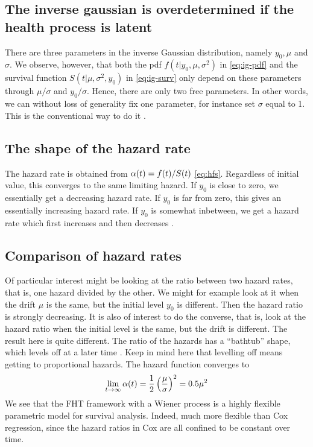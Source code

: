 \subsection{The inverse gaussian is overdetermined if the health process is latent}
There are three parameters in the inverse Gaussian distribution, namely $y_0, \mu$ and $\sigma$. We observe, however, that both the pdf $f(t|y_0,\mu,\sigma^2)$ in \eqref{eq:ig-pdf} and the survival function $S(t|\mu,\sigma^2,y_0)$ in \eqref{eq:ig-surv} only depend on these parameters through $\mu/\sigma$ and $y_0/\sigma$. Hence, there are only two free parameters. In other words, we can without loss of generality fix one parameter, for instance set $\sigma$ equal to 1. This is the conventional way to do it \citep{leewhitmore2006}.

\subsection{The shape of the hazard rate}
The hazard rate is obtained from $\alpha(t)=f(t)/S(t)$ \eqref{eq:hfs}. Regardless of initial value, this converges to the same limiting hazard. If $y_0$ is close to zero, we essentially get a decreasing hazard rate. If $y_0$ is far from zero, this gives an essentially increasing hazard rate. If $y_0$ is somewhat inbetween, we get a hazard rate which first increases and then decreases \citep{ABG}.


\subsection{Comparison of hazard rates}
Of particular interest might be looking at the ratio between two hazard rates, that is, one hazard divided by the other. We might for example look at it when the drift $\mu$ is the same, but the initial level $y_0$ is different. Then the hazard ratio is strongly decreasing. It is also of interest to do the converse, that is, look at the hazard ratio when the initial level is the same, but the drift is different. The result here is quite different. The ratio of the hazards has a ``bathtub'' shape, which levels off at a later time \citep{ABG}. Keep in mind here that levelling off means getting to proportional hazards. The hazard function converges to
\begin{equation}
    \lim_{t\to\infty}\alpha(t)=\frac{1}{2}\left(\frac{\mu}{\sigma}\right)^2=0.5\mu^2
\end{equation}
We see that the FHT framework with a Wiener process is a highly flexible parametric model for survival analysis. Indeed, much more flexible than Cox regression, since the hazard ratios in Cox are all confined to be constant over time.

